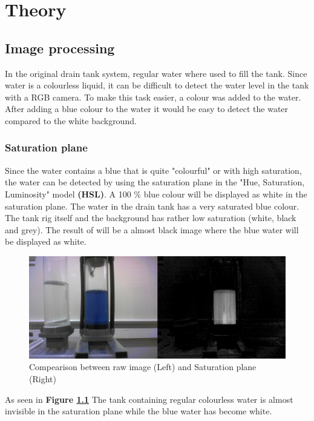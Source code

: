 \chapter{Theory}

\section{Image processing}
In the original drain tank system, regular water where used to fill the tank. Since water is a colourless liquid, it can be difficult to detect the water level in the tank with a RGB camera. To make this task easier, a colour was added to the water. After adding a blue colour to the water it would be easy to detect the water compared to the white background. 

\subsection{Saturation plane}
Since the water contains a blue that is quite "colourful" or with high saturation, the water can be detected by using the saturation plane in the "Hue, Saturation, Luminosity" model \textbf{(HSL)}. A 100 \% blue colour will be displayed as white in the saturation plane. The water in the drain tank has a very saturated blue colour. The tank rig itself and the background has rather low saturation (white, black and grey). The result of will be a almost black image where the blue water will be displayed as white.



\begin{figure}[t]
	\centering
	\includegraphics[width=1\textwidth]{pictures/SatRGB}
	\caption{Compearison between raw image (Left) and Saturation plane (Right)}
	\label{img:SRGB}
\end{figure}


As seen in \textbf{Figure \ref{img:SRGB}} The tank containing regular colourless water is almost invisible in the saturation plane while the blue water has become white.

